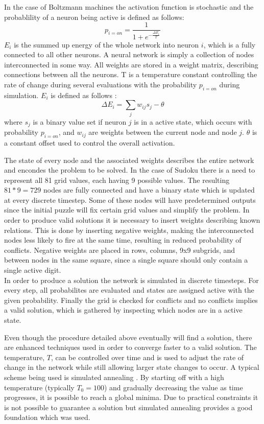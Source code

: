 \documentclass[a4paper,11pt]{kth-mag}
\begin{document}
In the case of Boltzmann machines the activation function is stochastic and the probablility of a neuron being active is defined as follows:
\[
p_{i=on} = \frac{1}{1+e^{-\frac{\Delta E_{i}}{T}}}
\]
$E_i$ is the summed up energy of the whole network into neuron $i$, which is a fully connected to all other neurons.
A neural network is simply a collection of nodes interconnected in some way.
All weights are stored in a weight matrix, describing connections between all the neurons.
T is a temperature constant controlling the rate of change during several evaluations with the probability $p_{i=on}$ during simulation.
$E_i$ is defined as follows \cite{boltzmann2}:
\[
\Delta E_{i} = \sum_{j} w_{ij} s_{j} - \theta
\]
where $s_j$ is a binary value set if neuron $j$ is in a active state, which occurs with probability $p_{i=on}$, and $w_{ij}$ are weights between the current node and node $j$. $\theta$ is a constant offset used to control the overall activation.

The state of every node and the associated weights describes the entire network and encondes the problem to be solved.
In the case of Sudoku there is a need to represent all 81 grid values, each having 9 possible values.
The resulting $81*9=729$ nodes are fully connected and have a binary state which is updated at every discrete timestep.
Some of these nodes will have predetermined outputs since the initial puzzle will fix certain grid values and simplify the problem.
In order to produce valid solutions it is necessary to insert weights describing known relations.
This is done by inserting negative weights, making the interconnected nodes less likely to fire at the same time, resulting in reduced probability of conflicts.
Negative weights are placed in rows, columns, 9x9 subgrids, and between nodes in the same square, since a single square should only contain a single active digit.\\

In order to produce a solution the network is simulated in discrete timesteps.
For every step, all probabilites are evaluated and states are assigned active with the given probability.
Finally the grid is checked for conflicts and no conflicts implies a valid solution, which is gathered by inspecting which nodes are in a active state.

Even though the procedure detailed above eventually will find a solution, there are enhanced techniques used in order to converge faster to a valid solution.
The temperature, $T$, can be controlled over time and is used to adjust the rate of change in the network while still allowing larger state changes to occur.
A typical scheme being used is simulated annealing \cite{simulatedAnnealing}.
By starting off with a high temperature (typically $T_0 = 100$) and gradually decreasing the value as time progresses, it is possible to reach a global minima.
Due to practical constraints it is not possible to guarantee a solution but simulated annealing provides a good foundation which was used.\\
\end{document}
